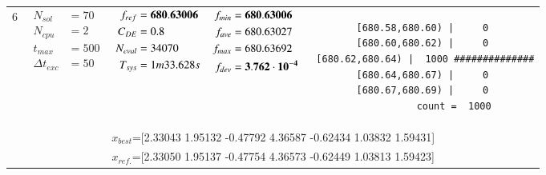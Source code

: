 \begin{table*} [!t]
\begin{tabular}[c]{ccccc}
6
&
{$\!\begin{aligned}
    N_{sol}        &= 70 \\
	N_{cpu}        &= 2 \\
	t_{max}        &= 500 \\
	\Delta t_{exc} &= 50
\end{aligned}$}
&
{$\!\begin{aligned}
	f_{ref} &= {\bf 680.63006} \\
	C_{DE}   &= 0.8 \\
	N_{eval} &= 34070 \\
	T_{sys}  &= 1m33.628s
\end{aligned}$}
&
{$\!\begin{aligned}
    f_{min} &= {\bf 680.63006} \\
    f_{ave} &= 680.63027 \\
    f_{max} &= 680.63692 \\
    f_{dev} &= {\bf 3.762\cdot 10^{-4}}
\end{aligned}$}
&
\begin{minipage}{4.1cm} \fontsize{5pt}{6pt}
\begin{verbatim}
 [680.58,680.60) |     0 
 [680.60,680.62) |     0 
 [680.62,680.64) |  1000 ##############
 [680.64,680.67) |     0 
 [680.67,680.69) |     0 
           count =  1000
 \end{verbatim}
\end{minipage} \\
\multicolumn{5}{c}{{\scriptsize $x_{best}$=[2.33043 1.95132 -0.47792 4.36587 -0.62434 1.03832 1.59431]}} \\
\multicolumn{5}{c}{{\scriptsize $x_{ref.}$=[2.33050 1.95137 -0.47754 4.36573 -0.62449 1.03813 1.59423]}} \\

\hline




\end{tabular}
\end{table*}
